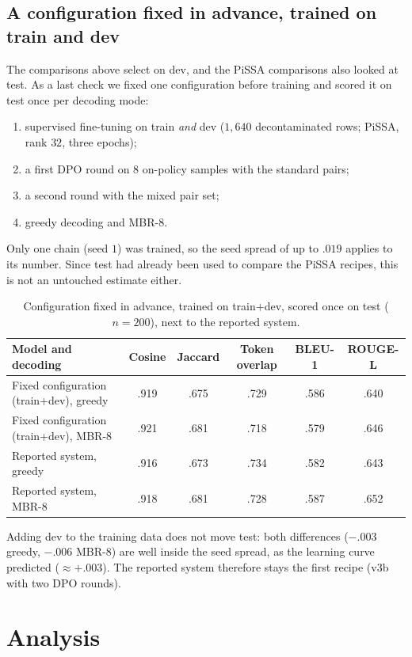 \documentclass[11pt,a4paper]{article}
\newcommand{\rl}{ROUGE-L}
\begin{document}
\subsection{A configuration fixed in advance, trained on train and dev}\label{sec:finalchain}
The comparisons above select on dev, and the PiSSA comparisons also looked at test. As a last check we fixed one configuration before training and scored it on test once per decoding mode:
\begin{enumerate}[leftmargin=*]
\item supervised fine-tuning on train \emph{and} dev ($1{,}640$ decontaminated rows; PiSSA, rank $32$, three epochs);
\item a first DPO round on $8$ on-policy samples with the standard pairs;
\item a second round with the mixed pair set;
\item greedy decoding and MBR-8.
\end{enumerate}
Only one chain (seed $1$) was trained, so the seed spread of up to $.019$ applies to its number. Since test had already been used to compare the PiSSA recipes, this is not an untouched estimate either.
\begin{table}[H]
\centering\small
\caption{Configuration fixed in advance, trained on train$+$dev, scored once on test ($n{=}200$), next to the reported system.}\label{tab:finalchain}
\begin{tabular}{lccccc}
\toprule
Model and decoding & Cosine & Jaccard & Token overlap & BLEU-1 & \rl{} \\
\midrule
Fixed configuration (train+dev), greedy & .919 & .675 & .729 & .586 & .640 \\
Fixed configuration (train+dev), MBR-8 & .921 & .681 & .718 & .579 & .646 \\
Reported system, greedy & .916 & .673 & .734 & .582 & .643 \\
Reported system, MBR-8 & .918 & .681 & .728 & .587 & .652 \\
\bottomrule
\end{tabular}
\end{table}
\noindent Adding dev to the training data does not move test: both differences ($-.003$ greedy, $-.006$ MBR-8) are well inside the seed spread, as the learning curve predicted ($\approx+.003$). The reported system therefore stays the first recipe (v3b with two DPO rounds).

\section{Analysis}\label{sec:analysis}
\end{document}

